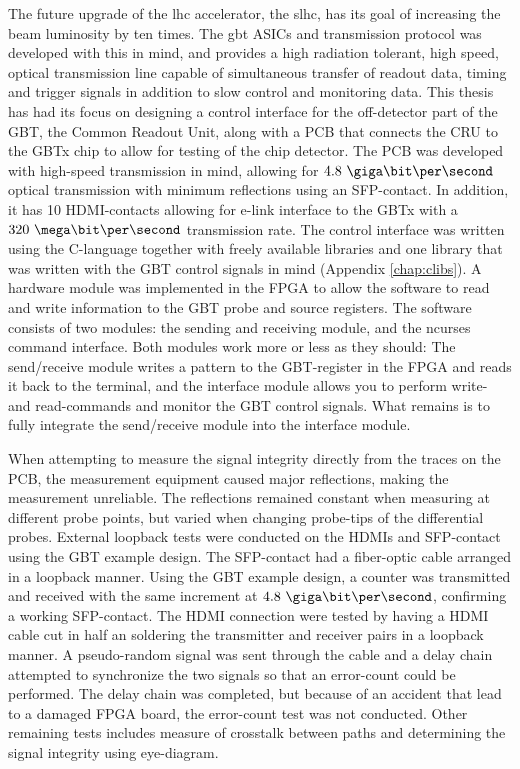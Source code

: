 \documentclass[main.tex]{subfiles}
\begin{document}
The future upgrade of the \acrlong{lhc} accelerator, the \acrlong{slhc}, has its goal of increasing the beam luminosity by ten times. The \acrlong{gbt} ASICs and transmission protocol was developed with this in mind, and provides a high radiation tolerant, high speed, optical transmission line capable of simultaneous transfer of readout data, timing and trigger signals in addition to slow control and monitoring data. This thesis has had its focus on designing a control interface for the off-detector part of the GBT, the Common Readout Unit, along with a PCB that connects the CRU to the GBTx chip to allow for testing of the chip detector. The PCB was developed with high-speed transmission in mind, allowing for $4.8~\giga\bit\per\second$ optical transmission with minimum reflections using an SFP-contact. In addition, it has 10 HDMI-contacts allowing for e-link interface to the GBTx with a $320~\mega\bit\per\second$ transmission rate. The control interface was written using the C-language together with freely available libraries and one library that was written with the GBT control signals in mind (Appendix \ref{chap:clibs}). A hardware module was implemented in the FPGA to allow the software to read and write information to the GBT probe and source registers. The software consists of two modules: the sending and receiving module, and the ncurses command interface. Both modules work more or less as they should: The send/receive module writes a pattern to the GBT-register in the FPGA and reads it back to the terminal, and the interface module allows you to perform write- and read-commands and monitor the GBT control signals. What remains is to fully integrate the send/receive module into the interface module.

When attempting to measure the signal integrity directly from the traces on the PCB, the measurement equipment caused major reflections, making the measurement unreliable. The reflections remained constant when measuring at different probe points, but varied when changing probe-tips of the differential probes. External loopback tests were conducted on the HDMIs and SFP-contact using the GBT example design. The SFP-contact had a fiber-optic cable arranged in a loopback manner. Using the GBT example design, a counter was transmitted and received with the same increment at $4.8~\giga\bit\per\second$, confirming a working SFP-contact. The HDMI connection were tested by having a HDMI cable cut in half an soldering the transmitter and receiver pairs in a loopback manner. A pseudo-random signal was sent through the cable and a delay chain attempted to synchronize the two signals so that an error-count could be performed. The delay chain was completed, but because of an accident that lead to a damaged FPGA board, the error-count test was not conducted. Other remaining tests includes measure of crosstalk between paths and determining the signal integrity using eye-diagram. 
\end{document}
